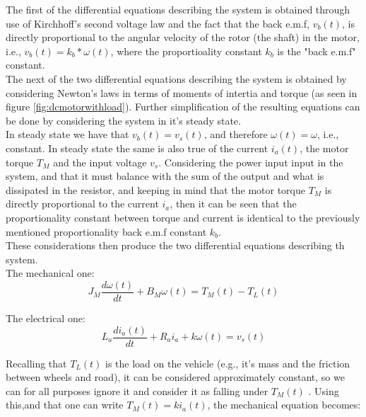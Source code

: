 \documentclass[a4paper,onecolumn,amsmath,amssymb]{revtex4-1}
\begin{document}
The first of the differential equations describing the system is obtained through use of Kirchhoff's second voltage law and the fact that the back e.m.f, $v_b (t)$, is directly proportional to the angular velocity of the rotor (the shaft) in the motor, i.e., $v_b (t)=k_b * \omega (t)$, where the proportioality constant $k_b$ is the "back e.m.f" constant. \\

The next of the two differential equations describing the system is obtained by considering Newton's laws in terms of moments of intertia and torque (as seen in figure \ref{fig:dcmotorwithload}). Further simplification of the resulting equations can be done by considering the system in it's steady state.\\

In steady state we have that $v_b (t) =v_s (t)$, and therefore $\omega (t)=\omega$, i.e., constant. In steady state the same is also true of the current $i_a (t)$, the motor torque $T_M $ and the input voltage $v_s$. Considering the power input input in the system, and that it must balance with the sum of the output and what is dissipated  in the resistor, and keeping in mind that the motor torque $T_M$ is directly proportional to the current $i_a$, then it can be seen that the proportionality constant between torque and current is identical to the previously mentioned proportionality back e.m.f constant $k_b$.\\

These considerations then produce the two differential equations describing th system.\\

The mechanical one:\\

\begin{equation}
J_M\frac{d\omega(t)}{dt}+B_M\omega(t)=T_M (t)-T_L (t)
\end{equation}

The electrical one:\\

\begin{equation}
L_a\frac{d i_a (t)}{dt}+R_a i_a+k\omega (t)=v_s (t)
\end{equation}

Recalling that $T_L(t)$ is the load on the vehicle (e.g., it's mass and the friction between wheels and road), it can be considered approximately constant, so we can for all purposes ignore it and consider it as falling under $T_M(t)$ . Using this,and that one can write $T_M(t)=k i_a(t)$, the mechanical equation becomes:\\
\end{document}
